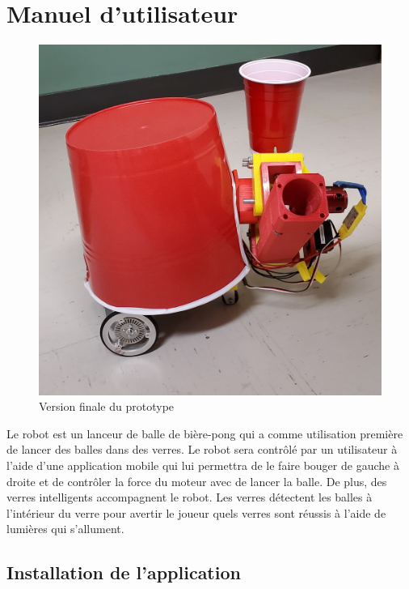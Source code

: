 \section{Manuel d’utilisateur}

\begin{figure}
    \centering
    \includegraphics[width=\linewidth]{img/a1/protoype}
    \caption{Version finale du prototype}
    \label{fig:a1-protoype}
\end{figure}

Le robot est un lanceur de balle de bière-pong qui a comme utilisation première de lancer des balles dans des verres.
Le robot sera contrôlé par un utilisateur à l’aide d’une application mobile qui lui permettra de le faire bouger de gauche à droite et de contrôler la force du moteur avec de lancer la balle.
De plus, des verres intelligents accompagnent le robot.
Les verres détectent les balles à l’intérieur du verre pour avertir le joueur quels verres sont réussis à l’aide de lumières qui s’allument.

\subsection{Installation de l’application}

